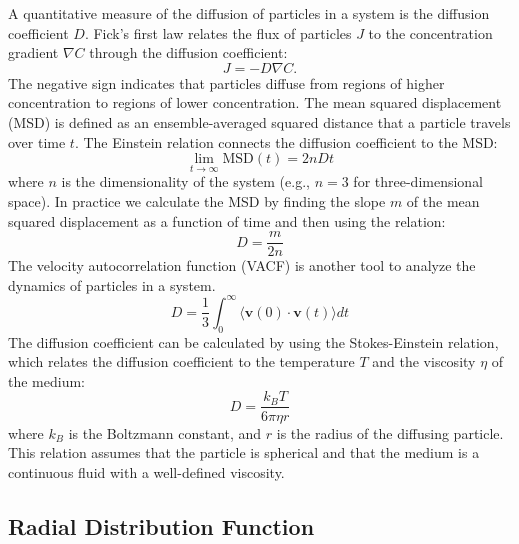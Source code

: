 A quantitative measure of the diffusion of particles in a system is the diffusion coefficient \(D\). Fick's first law relates the flux of particles \(J\) to the concentration gradient \(\nabla C\) through the diffusion coefficient:
\begin{equation}
    J = -D \nabla C.
\end{equation}
The negative sign indicates that particles diffuse from regions of higher concentration to regions of lower concentration. The mean squared displacement (MSD) is defined as an ensemble-averaged squared distance that a particle travels over time \(t\). The Einstein relation connects the diffusion coefficient to the MSD:
\begin{equation}
    \lim_{t\to\infty} \text{MSD}(t) = 2nDt
\end{equation}
where \(n\) is the dimensionality of the system (e.g., \(n=3\) for three-dimensional space).
In practice we calculate the MSD by finding the slope \(m\) of the mean squared displacement as a function of time and then using the relation:
\begin{equation}
    D = \frac{m}{2n}
\end{equation}
The velocity autocorrelation function (VACF) is another tool to analyze the dynamics of particles in a system.
\begin{equation}
    D = \frac{1}{3} \int_{0}^{\infty} \langle \mathbf{v}(0) \cdot \mathbf{v}(t) \rangle dt
\end{equation}
The diffusion coefficient can be calculated by using the Stokes-Einstein relation, which relates the diffusion coefficient to the temperature \(T\) and the viscosity \(\eta\) of the medium:
\begin{equation}
    D = \frac{k_B T}{6 \pi \eta r}
\end{equation}
where \(k_B\) is the Boltzmann constant, and \(r\) is the radius of the diffusing particle. This relation assumes that the particle is spherical and that the medium is a continuous fluid with a well-defined viscosity.

\subsection{Radial Distribution Function}

